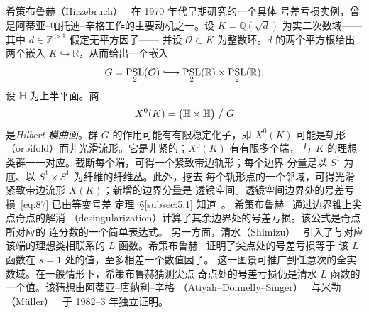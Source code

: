 \documentclass[11pt]{amsart}
\theoremstyle{definition}
\theoremstyle{remark}
\theoremstyle{plain}
\numberwithin{equation}{section}
\renewcommand{\:}{\colon}
\newcommand{\HH}{{\mathbb H}}
\newcommand{\QQ}{{\mathbb Q}}
\newcommand{\RR}{{\mathbb R}}
\newcommand{\ZZ}{{\mathbb Z}}
\newcommand{\cir}{S^1}
\DeclareMathOperator{\PSL}{PSL}
\DeclareMathOperator{\Sign}{Sign}
\newcommand{\hooklongrightarrow}{\lhook\joinrel\longrightarrow}
\newcommand{\sO}{\mathcal{O}}
\begin{document}
希策布鲁赫（Hirzebruch）~\cite{H4} 在 1970 年代早期研究的一个具体
号差亏损实例，曾是阿蒂亚–帕托迪–辛格工作的主要动机之一。设
$K=\QQ(\sqrt d)$ 为实二次数域——其中 $d\in \ZZ^{>1}$ 假定无平方因子——
并设 $\sO\subset K$ 为整数环。$d$ 的两个平方根给出两个嵌入
$K\hookrightarrow \RR$，从而给出一个嵌入
  \begin{equation}\label{eq:88}
     G=\PSL_2(\sO)\hooklongrightarrow \PSL_2(\RR)\times \PSL_2(\RR). 
  \end{equation}
设 $\HH$ 为上半平面。商
  \begin{equation}\label{eq:89}
     X^0(K) = \bigl(\HH\times \HH\bigr)\bigm/ G 
  \end{equation}
是\emph{Hilbert 模曲面}。群 $G$ 的作用可能有有限稳定化子，即 $X^0(K)$
可能是轨形（orbifold）而非光滑流形。它是非紧的；$X^0(K)$ 有有限多个端，
与 $K$ 的理想类群一一对应。截断每个端，可得一个紧致带边轨形；每个边界
分量是以 $\cir$ 为底、以 $\cir\times \cir$ 为纤维的纤维丛。此外，挖去
每个轨形点的一个邻域，可得光滑紧致带边流形 $X(K)$；新增的边界分量是
透镜空间。透镜空间边界处的号差亏损~\eqref{eq:87} 已由等变号差
定理~\S\ref{subsec:5.1} 知道~\cite[\S10.3]{A7}。
希策布鲁赫~\cite[p.~222]{H4} 通过边界锥上尖点奇点的解消
（desingularization）计算了其余边界处的号差亏损。该公式是奇点所对应的
连分数的一个简单表达式。
另一方面，清水（Shimizu）~\cite{Sh} 引入了与对应该端的理想类相联系的
$L$ 函数。希策布鲁赫~\cite[p.~231]{H4} 证明了尖点处的号差亏损等于
该 $L$ 函数在 $s=1$ 处的值，至多相差一个数值因子。
这一图景可推广到任意次的全实数域。在一般情形下，希策布鲁赫猜测尖点
奇点处的号差亏损仍是清水 $L$ 函数的一个值。该猜想由阿蒂亚–唐纳利–辛格
（Atiyah–Donnelly–Singer）~\cite{ADS} 与米勒（Müller）~\cite{Mu} 于
1982–3 年独立证明。
\end{document}

